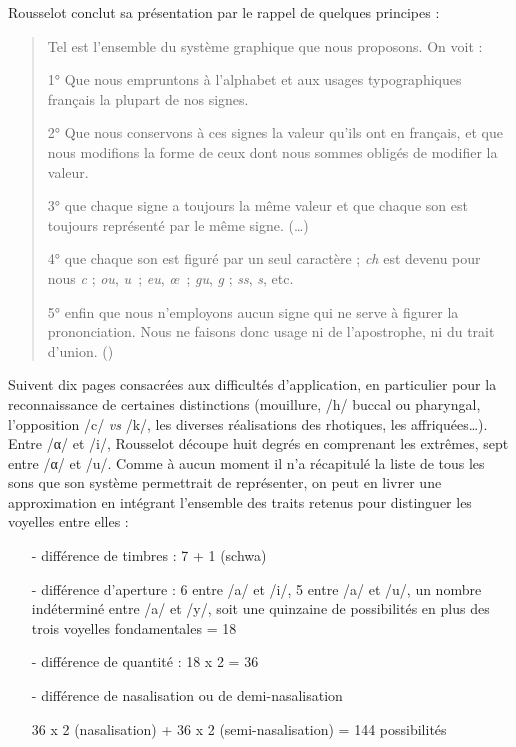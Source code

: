 \documentclass[output=paper]{langsci/langscibook}
\begin{document}
Rousselot conclut sa présentation par le rappel de quelques principes :

\begin{quote}
    Tel est l’ensemble du système graphique que nous proposons. On voit :

    1° Que nous empruntons à l’alphabet et aux usages typographiques français la plupart de nos signes.

    2° Que nous conservons à ces signes la valeur qu’ils ont en français, et que nous modifions la forme de ceux dont nous sommes obligés de modifier la valeur.

    3° que chaque signe a toujours la même valeur et que chaque son est toujours représenté par le même signe. (…)

    4° que chaque son est figuré par un seul caractère ; \textit{ch} est devenu pour nous \textit{c} ; \textit{ou}, \textit{u~}; \textit{eu}, \textit{œ~}; \textit{gu}, \textit{g} ; \textit{ss}, \textit{s}, etc.

    5° enfin que nous n’employons aucun signe qui ne serve à figurer la prononciation. Nous ne faisons donc usage ni de l’apostrophe, ni du trait d’union. (\citealt[6-7]{rousselot_introduction_1887})
\end{quote}

Suivent dix pages consacrées aux difficultés d’application, en particulier pour la reconnaissance de certaines distinctions (mouillure, /h/ buccal ou pharyngal, l’opposition /c/ \textit{vs} /k/, les diverses réalisations des rhotiques, les affriquées…). Entre /α/ et /i/, Rousselot découpe huit degrés en comprenant les extrêmes, sept entre /α/ et /u/. Comme à aucun moment il n’a récapitulé la liste de tous les sons que son système permettrait de représenter, on peut en livrer une approximation en intégrant l’ensemble des traits retenus pour distinguer les voyelles entre elles :

\begin{itemize}

    \item[-] différence de timbres : 7 + 1 (schwa)

    \item[-] différence d’aperture : 6 entre /a/ et /i/, 5 entre /a/ et /u/, un nombre indéterminé entre /a/ et /y/, soit une quinzaine de possibilités en plus des trois voyelles fondamentales = 18

    \item[-] différence de quantité : 18 x 2 = 36

        \item[-]différence de nasalisation ou de demi-nasalisation

\item[] 36 x 2 (nasalisation) + 36 x 2 (semi-nasalisation) = 144 possibilités

\end{itemize}
\end{document}
